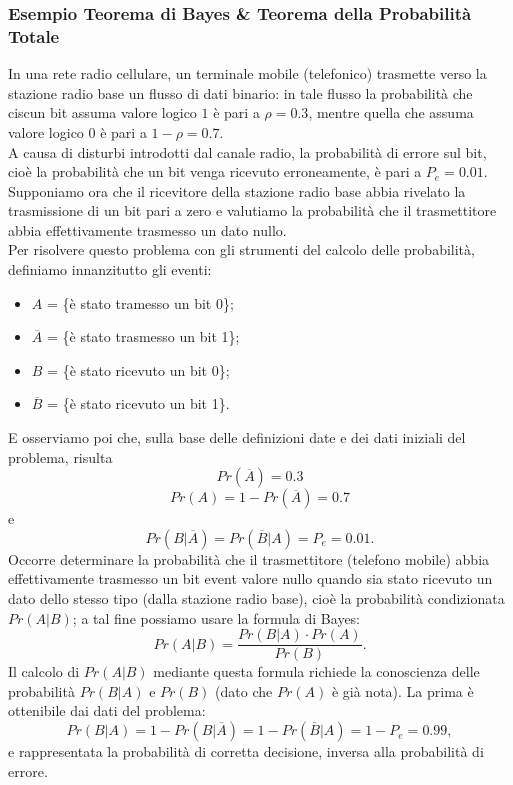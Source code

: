 \documentclass[12pt,oneside,openany]{memoir}
\numberwithin{equation}{subsection}
\begin{document}
\subsubsection{Esempio Teorema di Bayes \& Teorema della Probabilit\`a Totale}
In una rete radio cellulare, un terminale mobile (telefonico) trasmette verso la
stazione radio base un flusso di dati binario: in tale flusso la probabilit\`a
che ciscun bit assuma valore logico $1$ \`e pari a $\rho = 0.3$, mentre quella
che assuma valore logico $0$ \`e pari a $1 - \rho = 0.7$.\\
A causa di disturbi introdotti dal canale radio, la probabilit\`a di errore sul
bit, cio\`e la probabilit\`a che un bit venga ricevuto erroneamente, \`e pari a
$P_e = 0.01$. Supponiamo ora che il ricevitore della stazione radio base abbia
rivelato la trasmissione di un bit pari a zero e valutiamo la probabilit\`a che
il trasmettitore abbia effettivamente trasmesso un dato nullo.\\
Per risolvere questo problema con gli strumenti del calcolo delle probabilit\`a,
definiamo innanzitutto gli eventi:
\begin{itemize}
    \item $A$ = \{\`e stato tramesso un bit 0\};
    \item $\overline{A}$ = \{\`e stato trasmesso un bit 1\};
    \item $B$ = \{\`e stato ricevuto un bit 0\};
    \item $\overline{B}$ = \{\`e stato ricevuto un bit 1\}.
\end{itemize}
E osserviamo poi che, sulla base delle definizioni date e dei dati iniziali del
problema, risulta
\[
    Pr(\overline{A}) = 0.3
\]
\[
    Pr(A) = 1 - Pr(\overline{A}) = 0.7
\]
e
\[
    Pr(B | \overline{A}) = Pr(\overline{B} | A) = P_e = 0.01.
\]
Occorre determinare la probabilit\`a che il trasmettitore (telefono mobile)
abbia effettivamente trasmesso un bit event valore nullo quando sia stato
ricevuto un dato dello stesso tipo (dalla stazione radio base), cio\`e la
probabilit\`a condizionata $Pr(A | B)$; a tal fine possiamo usare la formula di
Bayes:
\[
    Pr(A | B) = \frac{Pr(B | A) \cdot Pr(A)}{Pr(B)}.
\]
Il calcolo di $Pr(A | B)$ mediante questa formula richiede la conoscienza delle
probabilit\`a $Pr(B | A)$ e $Pr(B)$ (dato che $Pr(A)$ \`e gi\`a nota). La prima
\`e ottenibile dai dati del problema:
\[
    Pr(B | A) = 1 - Pr(B | \overline{A}) = 1 - Pr(\overline{B} | A) = 1 - P_e =
    0.99,
\]
e rappresentata la probabilit\`a di corretta decisione, inversa alla
probabilit\`a di errore.\\
\end{document}

